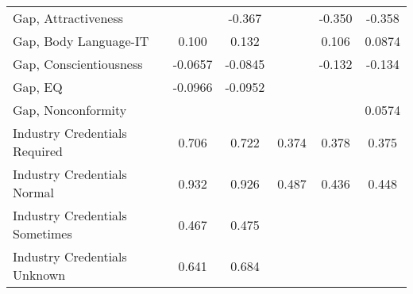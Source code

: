 {\begin{center}
{\begin{longtable}{l*{5}{c}}
Gap, Attractiveness      &                     &      -0.367\sym{***}&                     &      -0.350\sym{***}&      -0.358\sym{***}\\
\addlinespace
Gap, Body Language-IT    &        0.100      &       0.132         &                     &       0.106         &      0.0874         \\
\addlinespace
Gap, Conscientiousness   &         -0.0657              &     -0.0845         &                     &      -0.132\sym{**} &      -0.134\sym{**} \\
\addlinespace
Gap, EQ                  &            -0.0966         &     -0.0952         &                     &                     &                     \\
\addlinespace
Gap, Nonconformity        &                     &                     &                     &                     &      0.0574         \\
\addlinespace


Industry Credentials Required&       0.706\sym{*}  &       0.722\sym{**} &       0.374         &       0.378         &       0.375         \\
\addlinespace
Industry Credentials Normal&       0.932\sym{**} &       0.926\sym{**} &       0.487\sym{*}  &       0.436\sym{*}  &       0.448\sym{*}  \\
\addlinespace
Industry Credentials Sometimes&       0.467         &       0.475         &                     &                     &                     \\
\addlinespace
Industry Credentials Unknown&       0.641\sym{*}  &       0.684\sym{**} &                     &                     &                     \\


\end{longtable}}
\end{center}}
